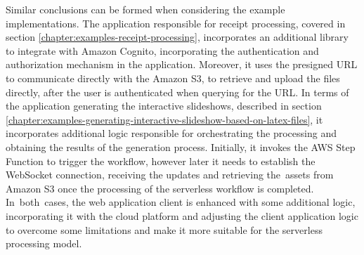 Similar conclusions can be formed when considering the example implementations.
The application responsible for receipt processing, covered in section \ref{chapter:examples-receipt-processing}, incorporates an additional library to integrate with Amazon Cognito, incorporating the authentication and authorization mechanism in the application.
Moreover, it uses the presigned URL to communicate directly with the Amazon S3, to retrieve and upload the files directly, after the user is authenticated when querying for the URL.
In terms of the application generating the interactive slideshows, described in section \ref{chapter:examples-generating-interactive-slideshow-based-on-latex-files}, it incorporates additional logic responsible for orchestrating the processing and obtaining the results of the generation process.
Initially, it invokes the AWS Step Function to trigger the workflow, however later it needs to establish the WebSocket connection, receiving the updates and retrieving the~assets from Amazon S3 once the processing of the serverless workflow is completed.
In~both~cases, the web application client is enhanced with some additional logic, incorporating it with the cloud platform and adjusting the client application logic to overcome some limitations and make it more suitable for the serverless processing model.